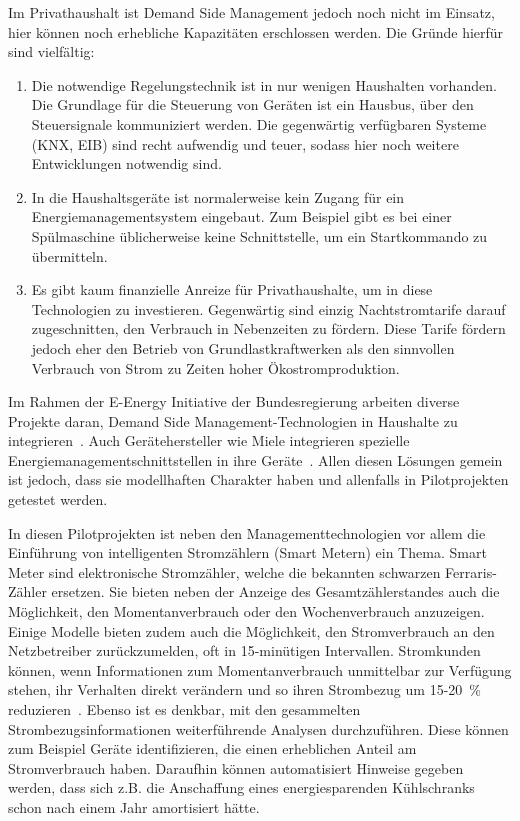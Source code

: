 \documentclass[12pt,BCOR=8.5mm]{scrartcl}
\begin{document}
Im Privathaushalt ist Demand Side Management jedoch noch nicht im
Einsatz, hier können noch erhebliche Kapazitäten erschlossen werden. Die
Gründe hierfür sind vielfältig: 

\begin{enumerate}
  \item Die notwendige Regelungstechnik ist in nur wenigen Haushalten
    vorhanden. Die Grundlage für die Steuerung von Geräten ist ein
    Hausbus, über den Steuersignale kommuniziert werden. Die gegenwärtig
    verfügbaren Systeme (KNX, EIB) sind recht aufwendig und teuer,
    sodass hier noch weitere Entwicklungen notwendig sind.
  \item In die Haushaltsgeräte ist normalerweise kein Zugang für ein
    Energiemanagementsystem eingebaut. Zum Beispiel gibt es bei einer
    Spülmaschine üblicherweise keine Schnittstelle, um ein Startkommando
    zu übermitteln.
  \item Es gibt kaum finanzielle Anreize für Privathaushalte, um in
    diese Technologien zu investieren. Gegenwärtig sind einzig
    Nachtstromtarife darauf zugeschnitten, den Verbrauch in Nebenzeiten
    zu fördern. Diese Tarife fördern jedoch eher den Betrieb von
    Grundlastkraftwerken als den sinnvollen Verbrauch von Strom zu
    Zeiten hoher Ökostromproduktion.
\end{enumerate}


Im Rahmen der E-Energy Initiative der Bundesregierung arbeiten diverse
Projekte daran, Demand Side Management-Technologien in Haushalte zu
integrieren~\cite{web:e-energy}. Auch Gerätehersteller wie Miele
integrieren spezielle Energiemanagementschnittstellen in ihre
Geräte~\cite{miele10ifapresse}. Allen diesen Lösungen gemein ist jedoch,
dass sie modellhaften Charakter haben und allenfalls in Pilotprojekten
getestet werden.

In diesen Pilotprojekten ist neben den Managementtechnologien vor allem
die Einführung von intelligenten Stromzählern (Smart Metern) ein Thema.
Smart Meter sind elektronische Stromzähler, welche die bekannten
schwarzen Ferraris-Zähler ersetzen. Sie bieten neben der Anzeige des
Gesamtzählerstandes auch die Möglichkeit, den Momentanverbrauch oder den
Wochenverbrauch anzuzeigen. Einige Modelle bieten zudem auch die
Möglichkeit, den Stromverbrauch an den Netzbetreiber zurückzumelden, oft
in 15-minütigen Intervallen. Stromkunden können, wenn
Informationen zum Momentanverbrauch unmittelbar zur Verfügung stehen,
ihr Verhalten direkt verändern und so ihren Strombezug um 15-20~\%
reduzieren~\cite{geller2010smartgrid}. Ebenso ist es denkbar, mit den
gesammelten Strombezugsinformationen weiterführende Analysen
durchzuführen. Diese können zum Beispiel Geräte identifizieren, die
einen erheblichen Anteil am Stromverbrauch haben. Daraufhin können
automatisiert Hinweise gegeben werden, dass sich z.B. die Anschaffung
eines energiesparenden Kühlschranks schon nach einem Jahr amortisiert
hätte.
\end{document}

